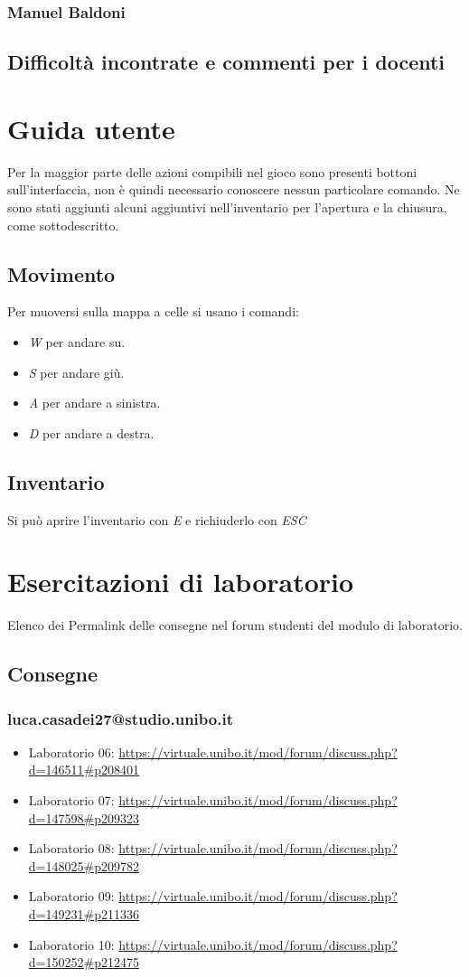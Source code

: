 \documentclass[a4paper,12pt]{report}
\begin{document}
\subsection*{Manuel Baldoni}

\section{Difficoltà incontrate e commenti per i docenti}

\appendix
\chapter{Guida utente}
Per la maggior parte delle azioni compibili nel gioco sono presenti bottoni sull'interfaccia, non è quindi necessario conoscere nessun particolare comando. Ne sono stati aggiunti alcuni aggiuntivi nell'inventario per l'apertura e la chiusura, come sottodescritto.
\section{Movimento}
Per muoversi sulla mappa a celle si usano i comandi:
\begin{itemize}
	\item \textit{W} per andare su.
	\item \textit{S} per andare giù.
	\item \textit{A} per andare a sinistra.
	\item \textit{D} per andare a destra.
\end{itemize}
\section{Inventario}
Si può aprire l'inventario con \textit{E} e richiuderlo con \textit{ESC}

\chapter{Esercitazioni di laboratorio}
Elenco dei Permalink delle consegne nel forum studenti del modulo di laboratorio.
\section*{Consegne}
\subsection{luca.casadei27@studio.unibo.it}
\begin{itemize}
	\item Laboratorio 06: \url{https://virtuale.unibo.it/mod/forum/discuss.php?d=146511#p208401}
	\item Laboratorio 07: \url{https://virtuale.unibo.it/mod/forum/discuss.php?d=147598#p209323}
	\item Laboratorio 08: \url{https://virtuale.unibo.it/mod/forum/discuss.php?d=148025#p209782}
	\item Laboratorio 09: \url{https://virtuale.unibo.it/mod/forum/discuss.php?d=149231#p211336}
	\item Laboratorio 10: \url{https://virtuale.unibo.it/mod/forum/discuss.php?d=150252#p212475}
\end{itemize}
\end{document}
